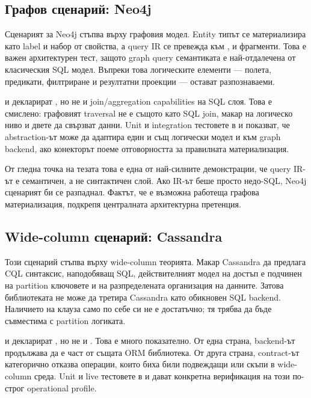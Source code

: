 \subsection{Графов сценарий: Neo4j}

Сценарият за Neo4j стъпва върху графовия модел. Entity типът се материализира като label и набор от свойства, а query IR се превежда към ,  и  фрагменти. Това е важен архитектурен тест, защото graph query семантиката е най-отдалечена от класическия SQL модел. Въпреки това логическите елементи --- полета, предикати, филтриране и резултатни проекции --- остават разпознаваеми.

 и  декларират , но не и join/aggregation capabilities на SQL слоя. Това е смислено: графовият traversal не е същото като SQL join, макар на логическо ниво и двете да свързват данни. Unit и integration тестовете в  и  показват, че abstraction-ът може да адаптира един и същ логически модел и към graph backend, ако конекторът поеме отговорността за правилната материализация.

От гледна точка на тезата това е една от най-силните демонстрации, че query IR-ът е семантичен, а не синтактичен слой. Ако IR-ът беше просто недо-SQL, Neo4j сценарият би се разпаднал. Фактът, че е възможна работеща графова материализация, подкрепя централната архитектурна претенция.

\subsection{Wide-column сценарий: Cassandra}

Този сценарий стъпва върху wide-column теорията. Макар Cassandra да предлага CQL синтаксис, наподобяващ SQL, действителният модел на достъп е подчинен на partition ключовете и на разпределената организация на данните. Затова библиотеката не може да третира Cassandra като обикновен SQL backend. Наличието на  клауза само по себе си не е достатъчно; тя трябва да бъде съвместима с partition логиката.

 и  декларират , но не и . Това е много показателно. От една страна, backend-ът продължава да е част от същата ORM библиотека. От друга страна, contract-ът категорично отказва операции, които биха били подвеждащи или скъпи в wide-column среда. Unit и live тестовете в  и  дават конкретна верификация на този по-строг operational profile.

